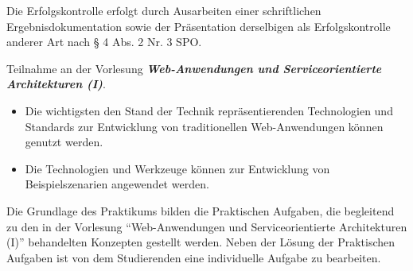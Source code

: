 \begin{course}

\setdoclanguagegerman
{}



\coursehead


\label{cour_14541.dp_997}


\begin{styleenv}
\begin{assessment}
Die Erfolgskontrolle erfolgt durch Ausarbeiten einer schriftlichen Ergebnisdokumentation sowie der Präsentation derselbigen als Erfolgskontrolle anderer Art nach § 4 Abs. 2 Nr. 3 SPO.


\end{assessment}

\begin{conditions}Teilnahme an der Vorlesung \textbf{\emph{Web-Anwendungen und Serviceorientierte Architekturen (I)}}.

\end{conditions}


\end{styleenv}

\begin{learningoutcomes}
\begin{itemize}\item Die wichtigsten den Stand der Technik repräsentierenden Technologien und Standards zur Entwicklung von traditionellen Web-Anwendungen können genutzt werden.  \item Die Technologien und Werkzeuge können zur Entwicklung von Beispielszenarien angewendet werden.  \end{itemize}
\end{learningoutcomes}

\begin{content}
Die Grundlage des Praktikums bilden die Praktischen Aufgaben, die begleitend zu den in der Vorlesung “Web-Anwendungen und Serviceorientierte Architekturen (I)” behandelten Konzepten gestellt werden. Neben der Lösung der Praktischen Aufgaben ist von dem Studierenden eine individuelle Aufgabe zu bearbeiten.



\end{content}
\end{course}
